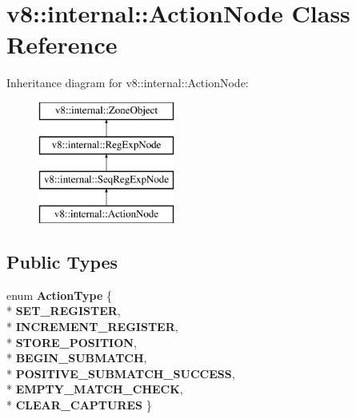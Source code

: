 \hypertarget{classv8_1_1internal_1_1_action_node}{}\section{v8\+:\+:internal\+:\+:Action\+Node Class Reference}
\label{classv8_1_1internal_1_1_action_node}
Inheritance diagram for v8\+:\+:internal\+:\+:Action\+Node\+:\begin{figure}[H]
\begin{center}
\leavevmode
\includegraphics[height=4.000000cm]{classv8_1_1internal_1_1_action_node}
\end{center}
\end{figure}
\subsection*{Public Types}
\begin{DoxyCompactItemize}
\item 
enum {\bfseries Action\+Type} \{ \\*
{\bfseries S\+E\+T\+\_\+\+R\+E\+G\+I\+S\+T\+ER}, 
\\*
{\bfseries I\+N\+C\+R\+E\+M\+E\+N\+T\+\_\+\+R\+E\+G\+I\+S\+T\+ER}, 
\\*
{\bfseries S\+T\+O\+R\+E\+\_\+\+P\+O\+S\+I\+T\+I\+ON}, 
\\*
{\bfseries B\+E\+G\+I\+N\+\_\+\+S\+U\+B\+M\+A\+T\+CH}, 
\\*
{\bfseries P\+O\+S\+I\+T\+I\+V\+E\+\_\+\+S\+U\+B\+M\+A\+T\+C\+H\+\_\+\+S\+U\+C\+C\+E\+SS}, 
\\*
{\bfseries E\+M\+P\+T\+Y\+\_\+\+M\+A\+T\+C\+H\+\_\+\+C\+H\+E\+CK}, 
\\*
{\bfseries C\+L\+E\+A\+R\+\_\+\+C\+A\+P\+T\+U\+R\+ES}
 \}\hypertarget{classv8_1_1internal_1_1_action_node_ab695380c09977f360b2d4f817f9124bc}{}\label{classv8_1_1internal_1_1_action_node_ab695380c09977f360b2d4f817f9124bc}

\end{DoxyCompactItemize}
